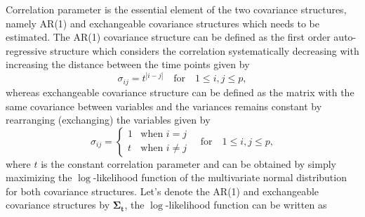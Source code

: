 Correlation parameter is the essential element of the two covariance structures, namely AR(1) and exchangeable covariance structures which needs to be estimated. The AR(1) covariance structure can be defined as the first order auto-regressive structure which considers the correlation systematically decreasing with increasing the distance between the time points given by
\begin{equation}
     \sigma_{ij} = t^{|i-j|} \quad     \text{for} \quad  1 \le i,j \le p,
     \label{equ2}
\end{equation}
whereas exchangeable covariance structure can be defined as the matrix with the same covariance between variables and the variances remains constant by rearranging (exchanging) the variables given by
\begin{equation}
\sigma_{ij} = 
\begin{cases}
                                   1 & \text{when $i=j$} \\
                                   t & \text{when $i \neq j$} 
  \end{cases} \quad     \text{for} \quad  1 \le i,j \le p,
  \label{equ3}
\end{equation}
where $t$ is the constant correlation parameter and can be obtained by simply maximizing the $\log$-likelihood function of the multivariate normal distribution for both covariance structures. Let's denote the AR(1) and exchangeable covariance structures by  $\boldsymbol{\Sigma_{t}}$, the $\log$-likelihood function can be written as

